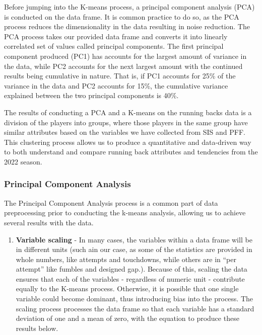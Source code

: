 \documentclass[
  letterpaper,
]{krantz}
\providecommand{\tightlist}{%
  \setlength{\itemsep}{0pt}\setlength{\parskip}{0pt}}\usepackage{longtable,booktabs,array}
\begin{document}
Before jumping into the K-means process, a principal component analysis
(PCA) is conducted on the data frame. It is common practice to do so, as
the PCA process reduces the dimensionality in the data resulting in
noise reduction. The PCA process takes our provided data frame and
converts it into linearly correlated set of values called principal
components. The first principal component produced (PC1) has accounts
for the largest amount of variance in the data, while PC2 accounts for
the next largest amount with the continued results being cumulative in
nature. That is, if PC1 accounts for 25\% of the variance in the data
and PC2 accounts for 15\%, the cumulative variance explained between the
two principal components is 40\%.

The results of conducting a PCA and a K-means on the running backs data
is a division of the players into groups, where those players in the
same group have similar attributes based on the variables we have
collected from SIS and PFF. This clustering process allows us to produce
a quantitative and data-driven way to both understand and compare
running back attributes and tendencies from the 2022 season.

\hypertarget{principal-component-analysis}{%
\subsubsection{Principal Component
Analysis}\label{principal-component-analysis}}

The Principal Component Analysis process is a common part of data
preprocessing prior to conducting the k-means analysis, allowing us to
achieve several results with the data.

\begin{enumerate}
\def\labelenumi{\arabic{enumi}.}
\tightlist
\item
  \textbf{Variable scaling} - In many cases, the variables within a data
  frame will be in different units (such ain our case, as some of the
  statistics are provided in whole numbers, like attempts and
  touchdowns, while others are in ``per attempt'' like fumbles and
  designed gap.). Because of this, scaling the data ensures that each of
  the variables - regardless of numeric unit - contribute equally to the
  K-means process. Otherwise, it is possible that one single variable
  could become dominant, thus introducing bias into the process. The
  scaling process processes the data frame so that each variable has a
  standard deviation of one and a mean of zero, with the equation to
  produce these results below.
\end{enumerate}
\end{document}
